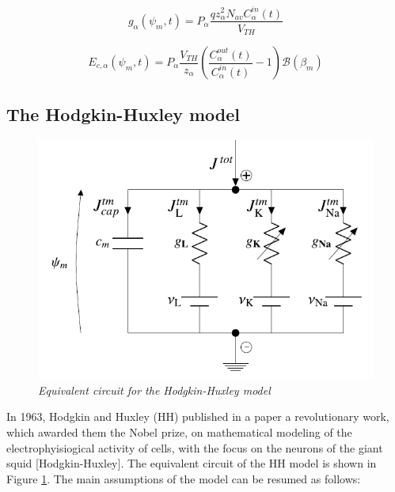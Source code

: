 \documentclass[12pt, a4paper]{article}
\begin{document}
\begin{equation}
g_{\alpha}(\psi_m,t) = P_{\alpha}\frac{q z_{\alpha}^2N_{av}C_{\alpha}^{in}(t)}{V_{TH}} 
\end{equation}

\begin{equation}
E_{c,\alpha}(\psi_m,t) = P_{\alpha}\frac{V_{TH}}{z_{\alpha}} \left(\frac{C_{\alpha}^{out}(t)}{C_{\alpha}^{in}(t)} - 1\right)\mathcal{B}(\beta_m)
\end{equation}



\subsection{The Hodgkin-Huxley model}

\begin{figure}[H]
	\begin{center}
		\includegraphics[scale=0.9]{HH.png} 
	\end{center} 
	\caption{\textit{Equivalent circuit for the Hodgkin-Huxley model}} \label{HH}
	
\end{figure}


In 1963, Hodgkin and Huxley (HH) published in a paper a revolutionary work, which awarded them the Nobel prize, on mathematical modeling of the electrophyisiogical activity of cells, with the focus on the neurons of the giant squid [Hodgkin-Huxley]. The equivalent circuit of the HH model is shown in Figure \ref{HH}. The main assumptions of the model can be resumed as follows:
\end{document}
